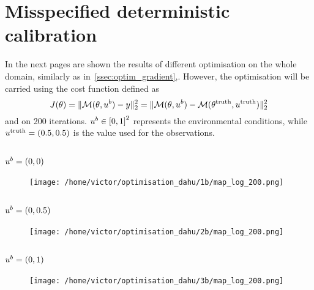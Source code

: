 \documentclass[../../Main_ManuscritThese.tex]{subfiles}
\begin{document}
\section{Misspecified deterministic calibration}
In the next pages are shown the results of different optimisation on
the whole domain, similarly as in~\cref{ssec:optim_gradient},. However, the optimisation will be carried using the cost
function defined as
\begin{equation}
  J(\theta) = \|\mathcal{M}(\theta, u^b) - y \|^2_2 = \|\mathcal{M}(\theta, u^b) - \mathcal{M}(\theta^{\mathrm{truth}},u^{\mathrm{truth}})\|_2^2
\end{equation}
and on \num{200} iterations. $\uu^b\in \interval{0}{1}^2$ represents
the environmental conditions, while $u^{\mathrm{truth}}=(0.5, 0.5)$ is the value used for the observations.%

\clearpage
\subsection*{$u^b=(0, 0)$}
\begin{figure}[ht]
  \centering
  \texttt{[image: /home/victor/optimisation\_dahu/1b/map\_log\_200.png]}
\end{figure}
\begin{figure}[ht]
  \centering
  \resizebox{1\textwidth}{!}{}
\end{figure}
\clearpage
\subsection*{$u^b=(0, 0.5)$}
\begin{figure}[ht]
  \centering
  \texttt{[image: /home/victor/optimisation\_dahu/2b/map\_log\_200.png]}
\end{figure}
\begin{figure}[ht]
  \centering
    \resizebox{1\textwidth}{!}{}
\end{figure}
\clearpage
\subsection*{$u^b=(0, 1)$}
\begin{figure}[ht]
  \centering
  \texttt{[image: /home/victor/optimisation\_dahu/3b/map\_log\_200.png]}
\end{figure}
\begin{figure}[ht]
  \centering
  \resizebox{1\textwidth}{!}{}
\end{figure}
\clearpage
\end{document}
